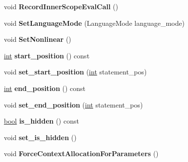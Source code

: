 \begin{DoxyCompactItemize}
void {\bfseries Record\+Inner\+Scope\+Eval\+Call} ()
\item 
\mbox{\label{classv8_1_1internal_1_1Scope_a078880d1ac4f07135782b33d237413c0}} 
void {\bfseries Set\+Language\+Mode} (Language\+Mode language\+\_\+mode)
\item 
\mbox{\label{classv8_1_1internal_1_1Scope_adcbad64c7a7c586ac7fdeb8c3231fef7}} 
void {\bfseries Set\+Nonlinear} ()
\item 
\mbox{\label{classv8_1_1internal_1_1Scope_aecc57958341880c5dee7c1f677cf3171}} 
\mbox{\hyperlink{classint}{int}} {\bfseries start\+\_\+position} () const
\item 
\mbox{\label{classv8_1_1internal_1_1Scope_ab8b18eaeaf400ee1798af3a45fb4cd50}} 
void {\bfseries set\+\_\+start\+\_\+position} (\mbox{\hyperlink{classint}{int}} statement\+\_\+pos)
\item 
\mbox{\label{classv8_1_1internal_1_1Scope_acd120cc143ee14aa533fbd192cced105}} 
\mbox{\hyperlink{classint}{int}} {\bfseries end\+\_\+position} () const
\item 
\mbox{\label{classv8_1_1internal_1_1Scope_a11abdf08eaa1d0a868efa18e28468820}} 
void {\bfseries set\+\_\+end\+\_\+position} (\mbox{\hyperlink{classint}{int}} statement\+\_\+pos)
\item 
\mbox{\label{classv8_1_1internal_1_1Scope_a9aba289406a1e1efaf17b660fe1778b7}} 
\mbox{\hyperlink{classbool}{bool}} {\bfseries is\+\_\+hidden} () const
\item 
\mbox{\label{classv8_1_1internal_1_1Scope_aa34113cf6e6a0795359b611dcfa234ac}} 
void {\bfseries set\+\_\+is\+\_\+hidden} ()
\item 
\mbox{\label{classv8_1_1internal_1_1Scope_a181167655fff18e78cca22ed64de72e0}} 
void {\bfseries Force\+Context\+Allocation\+For\+Parameters} ()
\item 
\mbox{\label{classv8_1_1internal_1_1Scope_a640c850e0a28ef839ce40df7e44f6077}} 

\end{DoxyCompactItemize}
